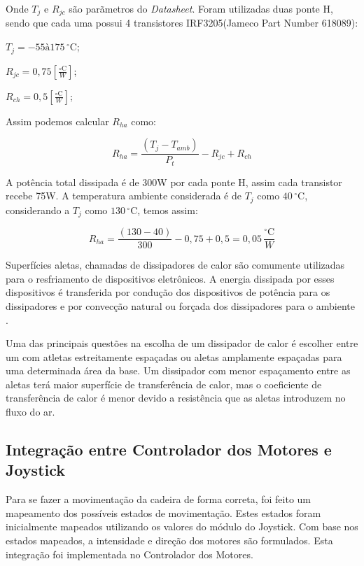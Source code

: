 				Onde $T_j$ e $R_{jc}$ são parãmetros do \textit{Datasheet}. Foram utilizadas duas ponte H, sendo que cada uma possui 4 transistores IRF3205(Jameco Part Number 618089)\cite{jameco}:

				$T_j = -55 à 175\,^{\circ}\mathrm{C}$;

				$R_{jc} = 0,75[\frac{{\circ}\mathrm{C}}{W}]$;

				$R_{ch} = 0,5[\frac{{\circ}\mathrm{C}}{W}]$;

				Assim podemos calcular $R_{ha}$ como:

				\begin{equation}
					R_{ha} = \frac{(T_j - T_{amb})}{P_t} - R_{jc} + R_{ch}
				\end{equation}

				A potência total dissipada é de 300W por cada ponte H, assim cada transistor recebe 75W. A temperatura ambiente considerada é de $T_j$ como $40\,^{\circ}\mathrm{C}$, considerando a $T_j$ como $130\,^{\circ}\mathrm{C}$, temos assim:

				\begin{equation}
				 R_{ha} = \frac{(130 - 40)}{300} - 0,75 + 0,5 = 0,05\,\frac{^{\circ}\mathrm{C}}{{W}}
				\end{equation}

				Superfícies aletas, chamadas de dissipadores de calor são comumente utilizadas para o resfriamento de dispositivos eletrônicos. A energia dissipada por esses dispositivos é transferida por condução dos dispositivos de potência para os dissipadores e por convecção natural ou forçada dos dissipadores para o ambiente \cite[p.~434-439]{cengel}. 

				Uma das principais questões na escolha de um dissipador de calor é escolher entre um com atletas estreitamente espaçadas ou aletas amplamente espaçadas para uma determinada área da base. Um dissipador com menor espaçamento entre as aletas terá maior superfície de transferência de calor, mas o coeficiente de transferência de calor é menor devido a resistência que as aletas introduzem no fluxo do ar.

	\subsection{Integração entre Controlador dos Motores e Joystick}

		Para se fazer a movimentação da cadeira de forma correta, foi feito um mapeamento dos possíveis estados de movimentação. Estes estados foram inicialmente mapeados utilizando os valores do módulo do Joystick. Com base nos estados mapeados, a intensidade e direção dos motores são formulados. Esta integração foi implementada no Controlador dos Motores.

